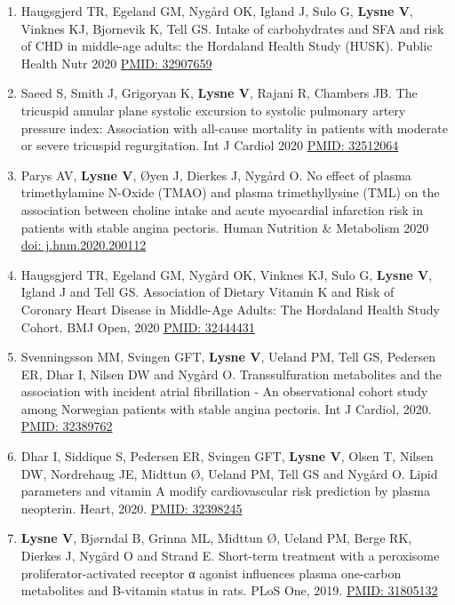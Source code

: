 \documentclass[11pt, a4paper]{awesome-cv}
\providecommand{\tightlist}{%
	\setlength{\itemsep}{0pt}\setlength{\parskip}{0pt}}
\begin{document}
\begin{enumerate}
\def\labelenumi{\arabic{enumi}.}
\tightlist
\item
  Haugsgjerd TR, Egeland GM, Nygård OK, Igland J, Sulo G, \textbf{Lysne V}, Vinknes KJ, Bjornevik K, Tell GS. Intake of carbohydrates and SFA and risk of CHD in middle-age adults: the Hordaland Health Study (HUSK). Public Health Nutr 2020 \href{https://pubmed.ncbi.nlm.nih.gov/32907659/}{PMID: 32907659}
\item
  Saeed S, Smith J, Grigoryan K, \textbf{Lysne V}, Rajani R, Chambers JB. The tricuspid annular plane systolic excursion to systolic pulmonary artery pressure index: Association with all-cause mortality in patients with moderate or severe tricuspid regurgitation. Int J Cardiol 2020 \href{https://pubmed.ncbi.nlm.nih.gov/32512064/}{PMID: 32512064}
\item
  Parys AV, \textbf{Lysne V}, Øyen J, Dierkes J, Nygård O.
  No effect of plasma trimethylamine N-Oxide (TMAO) and plasma trimethyllysine (TML) on the association between choline intake and acute myocardial infarction risk in patients with stable angina pectoris. Human Nutrition \& Metabolism 2020 \href{https://www.sciencedirect.com/science/article/pii/S2666149720300025}{doi: j.hnm.2020.200112}
\item
  Haugsgjerd TR, Egeland GM, Nygård OK, Vinknes KJ, Sulo G, \textbf{Lysne V}, Igland J and Tell GS. Association of Dietary Vitamin K and Risk of Coronary Heart Disease in Middle-Age Adults: The Hordaland Health Study Cohort. BMJ Open, 2020 \href{https://pubmed.ncbi.nlm.nih.gov/32444431}{PMID: 32444431}
\item
  Svenningsson MM, Svingen GFT, \textbf{Lysne V}, Ueland PM, Tell GS, Pedersen ER, Dhar I, Nilsen DW and Nygård O. Transsulfuration metabolites and the association with incident atrial fibrillation - An observational cohort study among Norwegian patients with stable angina pectoris. Int J Cardiol, 2020. \href{https://www.ncbi.nlm.nih.gov/pubmed/32389762}{PMID: 32389762}
\item
  Dhar I, Siddique S, Pedersen ER, Svingen GFT, \textbf{Lysne V}, Olsen T, Nilsen DW, Nordrehaug JE, Midttun Ø, Ueland PM, Tell GS and Nygård O. Lipid parameters and vitamin A modify cardiovascular risk prediction by plasma neopterin. Heart, 2020. \href{https://pubmed.ncbi.nlm.nih.gov/32398245/}{PMID: 32398245}
\item
  \textbf{Lysne V}, Bjørndal B, Grinna ML, Midttun Ø, Ueland PM, Berge RK, Dierkes J, Nygård O and Strand E. Short-term treatment with a peroxisome proliferator-activated receptor α agonist influences plasma one-carbon metabolites and B-vitamin status in rats. PLoS One, 2019. \href{https://www.ncbi.nlm.nih.gov/pubmed/31805132}{PMID: 31805132}

\end{enumerate}
\end{document}
